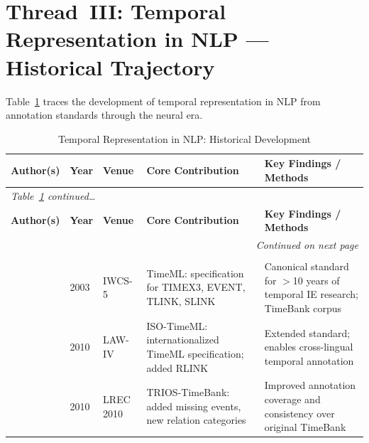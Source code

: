 \documentclass[12pt, a4paper]{article}
\begin{document}
\newpage

\section{Thread~III: Temporal Representation in NLP --- Historical Trajectory}

Table~\ref{tab:tr_history} traces the development of temporal representation in NLP from
annotation standards through the neural era.

\begin{longtable}{@{}p{3.8cm} p{1.0cm} p{2.6cm} p{4.5cm} p{3.2cm}@{}}
\caption{Temporal Representation in NLP: Historical Development}
\label{tab:tr_history}\\
\toprule
\textbf{Author(s)} & \textbf{Year} & \textbf{Venue} &
\textbf{Core Contribution} & \textbf{Key Findings / Methods} \\
\midrule
\endfirsthead
\multicolumn{5}{l}{\small\emph{Table~\ref{tab:tr_history} continued\ldots}}\\
\toprule
\textbf{Author(s)} & \textbf{Year} & \textbf{Venue} &
\textbf{Core Contribution} & \textbf{Key Findings / Methods} \\
\midrule
\endhead
\midrule
\multicolumn{5}{r}{\small\emph{Continued on next page}}\\
\endfoot
\bottomrule
\endlastfoot

\rowcolor{shadeC}
\multicolumn{5}{l}{\textcolor{threadC}{\textbf{3a. Annotation Standards: TimeML \& TimeBank}}}\\
\midrule

\textcite{pustejovsky2003timeml}
  & 2003 & IWCS-5
  & TimeML: specification for TIMEX3, EVENT, TLINK, SLINK
  & Canonical standard for $>$10 years of temporal IE research; TimeBank corpus \\[4pt]

\textcite{pustejovsky2010iso}
  & 2010 & LAW-IV
  & ISO-TimeML: internationalized TimeML specification; added RLINK
  & Extended standard; enables cross-lingual temporal annotation \\[4pt]

\textcite{llorens2010timebank}
  & 2010 & LREC 2010
  & TRIOS-TimeBank: added missing events, new relation categories
  & Improved annotation coverage and consistency over original TimeBank \\[4pt]


\end{longtable}
\end{document}
